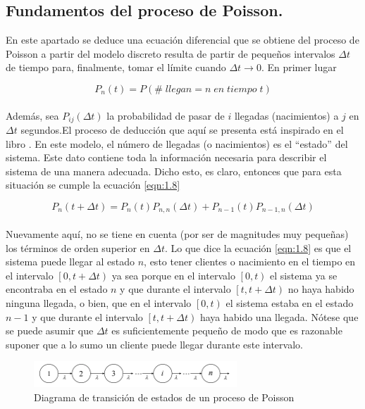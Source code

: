 \subsection{Fundamentos del proceso de Poisson.}
En este apartado se deduce una ecuación diferencial que se obtiene del proceso de Poisson a partir del modelo discreto resulta de partir de pequeños intervalos $ \Delta t $ de tiempo para, finalmente, tomar
el límite cuando $ \Delta t \rightarrow 0 $. En primer lugar

\begin{equation}
    P_{n}\left ( t \right ) = P \left ( \#\; llegan = n\; en\; tiempo\; t \right )
    \label{eqn:1.7}
\end{equation}
\\
Además, sea $ P_{ij}\left (  \Delta t \right ) $ la probabilidad de pasar de $i$ llegadas (nacimientos) a $j$ en $ \Delta t$ segundos.El proceso de deducción que aquí se presenta está inspirado en el libro \cite{kleinrock1975}. En este modelo, el número de llegadas (o nacimientos) es el “estado” del sistema. Este dato contiene toda la información necesaria para describir el sistema de una manera adecuada. Dicho esto, es claro, entonces que para esta situación se cumple la ecuación \ref{eqn:1.8}

\begin{equation}
    P_{n}\left ( t + \Delta t \right ) = P_{n}\left ( t \right )P_{n,n}\left ( \Delta t \right )+P_{n-1}\left ( t \right )P_{n-1,n}\left ( \Delta t \right )
    \label{eqn:1.8}
\end{equation}
\\
Nuevamente aquí, no se tiene en cuenta (por ser de magnitudes muy pequeñas) los términos de orden superior en $ \Delta t $. Lo que dice la ecuación \ref{eqn:1.8} es que el sistema puede llegar al estado $n$, esto tener clientes o nacimiento en el tiempo en el intervalo $ \left [ 0,t + \Delta t \right ) $ ya sea porque en el intervalo $ \left [ 0,t \right ) $ el sistema ya se encontraba en el estado $ n $ y que durante el intervalo $ \left [ t,t + \Delta t \right ) $ no haya habido ninguna llegada, o bien, que en el intervalo $ \left [ 0,t \right ) $ el sistema estaba en el estado
$ n-1 $ y que durante el intervalo $ \left [ t,t + \Delta t \right ) $ haya habido una llegada. Nótese que se puede asumir que $ \Delta t $ es suficientemente pequeño de modo que es razonable suponer que a lo sumo un cliente puede llegar durante este intervalo. 


\begin{figure}[H]
\centering
\includegraphics[width=3in]{chapters/chapter3/figures/Figura1-4:DiagramadetransiciondeestadosdeunprocesodePoisson.png}
\caption[Diagrama de transición de estados de un proceso de Poisson]{Diagrama de transición de estados de un proceso de Poisson}
\label{fig:mesh4}
\end{figure}

